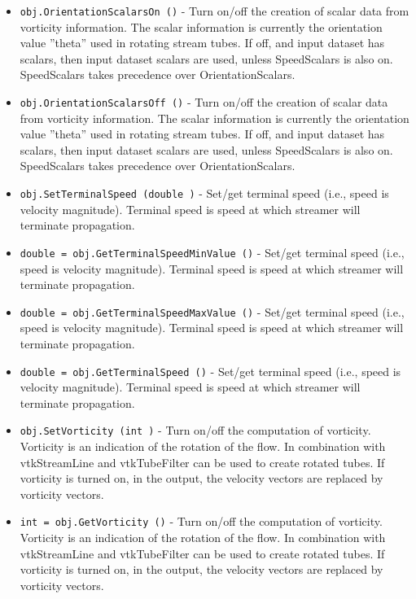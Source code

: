 \begin{itemize}
\item  \verb|obj.OrientationScalarsOn ()| -  Turn on/off the creation of scalar data from vorticity information. 
 The scalar information is currently the orientation value ''theta''
 used in rotating stream tubes. If off, and input dataset has scalars,
 then input dataset scalars are used, unless SpeedScalars is also on.
 SpeedScalars takes precedence over OrientationScalars.

\item  \verb|obj.OrientationScalarsOff ()| -  Turn on/off the creation of scalar data from vorticity information. 
 The scalar information is currently the orientation value ''theta''
 used in rotating stream tubes. If off, and input dataset has scalars,
 then input dataset scalars are used, unless SpeedScalars is also on.
 SpeedScalars takes precedence over OrientationScalars.

\item  \verb|obj.SetTerminalSpeed (double )| -  Set/get terminal speed (i.e., speed is velocity magnitude).  Terminal 
 speed is speed at which streamer will terminate propagation.

\item  \verb|double = obj.GetTerminalSpeedMinValue ()| -  Set/get terminal speed (i.e., speed is velocity magnitude).  Terminal 
 speed is speed at which streamer will terminate propagation.

\item  \verb|double = obj.GetTerminalSpeedMaxValue ()| -  Set/get terminal speed (i.e., speed is velocity magnitude).  Terminal 
 speed is speed at which streamer will terminate propagation.

\item  \verb|double = obj.GetTerminalSpeed ()| -  Set/get terminal speed (i.e., speed is velocity magnitude).  Terminal 
 speed is speed at which streamer will terminate propagation.

\item  \verb|obj.SetVorticity (int )| -  Turn on/off the computation of vorticity. Vorticity is an indication of
 the rotation of the flow. In combination with vtkStreamLine and 
 vtkTubeFilter can be used to create rotated tubes. 
 If vorticity is turned on, in the output, the velocity vectors 
 are replaced by vorticity vectors.

\item  \verb|int = obj.GetVorticity ()| -  Turn on/off the computation of vorticity. Vorticity is an indication of
 the rotation of the flow. In combination with vtkStreamLine and 
 vtkTubeFilter can be used to create rotated tubes. 
 If vorticity is turned on, in the output, the velocity vectors 
 are replaced by vorticity vectors.


\end{itemize}
